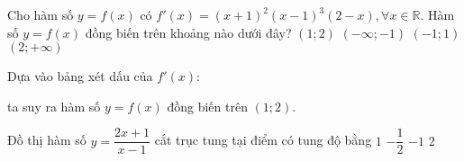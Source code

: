 \begin{ex}%
	Cho hàm số $y=f(x)$ có  $f'(x)=(x+1)^2(x-1)^3(2-x), \forall x\in \mathbb{R}$. Hàm số $y=f(x)$ đồng biến trên khoảng nào dưới đây?
	\choice
	{\True $(1;2)$}
	{$(-\infty;-1)$}
	{$(-1;1)$}
	{$(2;+\infty)$}
	\loigiai
	{
		Dựa vào bảng xét dấu của $f'(x)$:
		\begin{center}
		\end{center}
		ta suy ra hàm số $y=f(x)$ đồng biến trên $(1;2)$.
	}
\end{ex}

\begin{ex}%
	Đồ thị hàm số $y=\dfrac{2x+1}{x-1}$ cắt trục tung tại điểm có tung độ bằng
	\choice
	{$1$}
	{$-\dfrac{1}{2}$}
	{\True $-1$}
	{$2$}
\end{ex}

